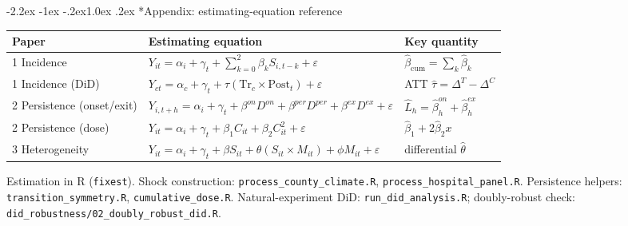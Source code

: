 \documentclass[11pt]{article}
\makeatletter
\renewcommand\section{\@startsection{section}{1}{\z@}%
  {-2.2ex \@plus -1ex \@minus -.2ex}{1.0ex \@plus .2ex}%
  {\normalfont\large\bfseries}}
\makeatother
\begin{document}
\appendix
\section*{Appendix: estimating-equation reference}
\small
\begin{center}
\begin{tabular}{lll}
\toprule
Paper & Estimating equation & Key quantity \\
\midrule
1 Incidence & $Y_{it}=\alpha_i+\gamma_t+\sum_{k=0}^2\beta_k S_{i,t-k}+\varepsilon$
  & $\hat\beta_{\mathrm{cum}}=\sum_k\hat\beta_k$ \\
1 Incidence (DiD) & $Y_{ct}=\alpha_c+\gamma_t+\tau(\text{Tr}_c{\times}\text{Post}_t)+\varepsilon$
  & ATT $\hat\tau=\Delta^T-\Delta^C$ \\
2 Persistence (onset/exit) & $Y_{i,t+h}=\alpha_i+\gamma_t+\beta^{on}D^{on}+\beta^{per}D^{per}+\beta^{ex}D^{ex}+\varepsilon$
  & $\hat L_h=\hat\beta^{on}_h+\hat\beta^{ex}_h$ \\
2 Persistence (dose) & $Y_{it}=\alpha_i+\gamma_t+\beta_1 C_{it}+\beta_2 C_{it}^2+\varepsilon$
  & $\hat\beta_1+2\hat\beta_2 x$ \\
3 Heterogeneity & $Y_{it}=\alpha_i+\gamma_t+\beta S_{it}+\theta(S_{it}{\times}M_{it})+\phi M_{it}+\varepsilon$
  & differential $\hat\theta$ \\
\bottomrule
\end{tabular}
\end{center}

\vspace{2pt}
\footnotesize\noindent
Estimation in R (\texttt{fixest}). Shock construction:
\texttt{process\_county\_climate.R}, \texttt{process\_hospital\_panel.R}.
Persistence helpers: \texttt{transition\_symmetry.R}, \texttt{cumulative\_dose.R}.
Natural-experiment DiD: \texttt{run\_did\_analysis.R};
doubly-robust check: \texttt{did\_robustness/02\_doubly\_robust\_did.R}.
\end{document}
